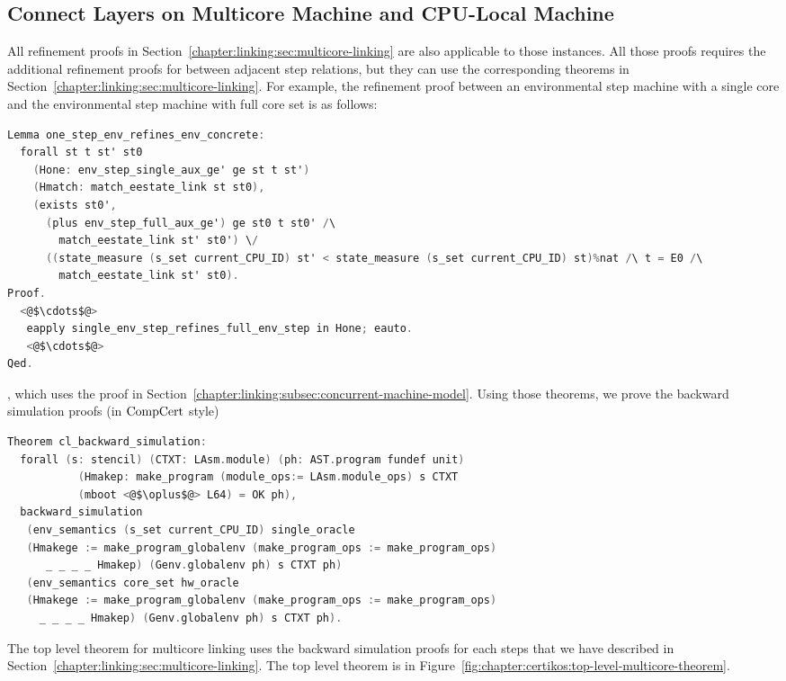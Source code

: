 
\subsection{Connect Layers on Multicore Machine and CPU-Local Machine}
\label{chapter:certikos:subsec:connect-multicore}

All refinement proofs in Section~\ref{chapter:linking:sec:multicore-linking} are also applicable 
to those instances. 
All those proofs requires the additional refinement proofs for between adjacent step relations, but they can 
use the corresponding theorems in Section~\ref{chapter:linking:sec:multicore-linking}. 
For example, the refinement proof between an environmental step machine with a single core and the environmental step machine with full core set is 
as follows:
\begin{lstlisting}[language=C]
Lemma one_step_env_refines_env_concrete:
  forall st t st' st0
    (Hone: env_step_single_aux_ge' ge st t st')
    (Hmatch: match_eestate_link st st0),
    (exists st0',
      (plus env_step_full_aux_ge') ge st0 t st0' /\
        match_eestate_link st' st0') \/
      ((state_measure (s_set current_CPU_ID) st' < state_measure (s_set current_CPU_ID) st)%nat /\ t = E0 /\
        match_eestate_link st' st0).
Proof.
  <@$\cdots$@>
   eapply single_env_step_refines_full_env_step in Hone; eauto.
   <@$\cdots$@>
Qed.
\end{lstlisting}
, which uses the proof in Section~\ref{chapter:linking:subsec:concurrent-machine-model}.
Using those theorems, 
we prove the backward simulation proofs (in $\mathrm{CompCert}$ style) 
\begin{lstlisting}[language=C]
Theorem cl_backward_simulation:
  forall (s: stencil) (CTXT: LAsm.module) (ph: AST.program fundef unit)
           (Hmakep: make_program (module_ops:= LAsm.module_ops) s CTXT 
           (mboot <@$\oplus$@> L64) = OK ph),
  backward_simulation
   (env_semantics (s_set current_CPU_ID) single_oracle
   (Hmakege := make_program_globalenv (make_program_ops := make_program_ops)
      _ _ _ _ Hmakep) (Genv.globalenv ph) s CTXT ph)
   (env_semantics core_set hw_oracle
   (Hmakege := make_program_globalenv (make_program_ops := make_program_ops) 
     _ _ _ _ Hmakep) (Genv.globalenv ph) s CTXT ph).
\end{lstlisting}

The top level theorem for multicore linking uses the backward simulation proofs 
for each steps that we have described in Section~\ref{chapter:linking:sec:multicore-linking}.
The top level theorem is in Figure~\ref{fig:chapter:certikos:top-level-multicore-theorem}.

